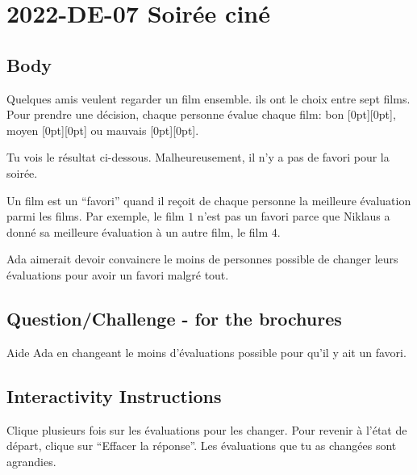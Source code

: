 \documentclass[a4paper,11pt]{report}
\newcommand{\taskGraphicsFolder}{..}
\begin{document}
\section*{\centering{} 2022-DE-07 Soirée ciné}


\subsection*{Body}

Quelques amis veulent regarder un film ensemble. ils ont le choix entre sept films. Pour prendre une décision, chaque personne évalue chaque film: bon \raisebox{-0.5ex}[0pt][0pt]{}, moyen \raisebox{-0.5ex}[0pt][0pt]{} ou mauvais \raisebox{-0.5ex}[0pt][0pt]{}.

Tu vois le résultat ci-dessous. Malheureusement, il n’y a pas de favori pour la soirée.

Un film est un “favori” quand il reçoit de chaque personne la meilleure évaluation parmi les films. Par exemple, le film $1$ n’est pas un favori parce que Niklaus a donné sa meilleure évaluation à un autre film, le film $4$.

Ada aimerait devoir convaincre le moins de personnes possible de changer leurs évaluations pour avoir un favori malgré tout.

{\em


\subsection*{Question/Challenge - for the brochures}

Aide Ada en changeant le moins d’évaluations possible pour qu’il y ait un favori.

{\centering%
\par}

}


\subsection*{Interactivity Instructions}

Clique plusieurs fois sur les évaluations pour les changer. Pour revenir à l’état de départ, clique sur “Effacer la réponse”. Les évaluations que tu as changées sont agrandies.
\end{document}
